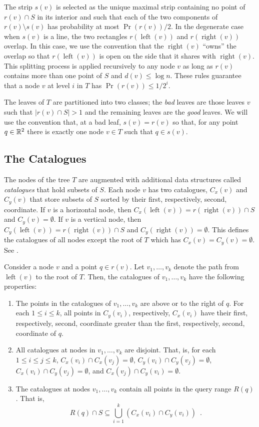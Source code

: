 \documentclass[lotsofwhite,charterfonts]{patmorin}
\DeclareMathOperator{\lft}{left}
\DeclareMathOperator{\rght}{right}
\newcommand{\depth}{d}
\begin{document}
The strip $s(v)$ is selected as the unique maximal strip containing no
point of $r(v)\cap S$ in its interior and such that each of the two
components of $r(v)\setminus s(v)$ has probability at most
$\Pr(r(v))/2$.  In the degenerate case when $s(v)$ is a line, the two
rectangles $r(\lft(v))$ and $r(\rght(v))$ overlap.  In this case, we
use the convention that the $\rght(v)$ ``owns'' the overlap so that
$r(\lft(v))$ is open on the side that it shares with $\rght(v)$.  This
splitting process is applied recursively to any node $v$ as long as
$r(v)$ contains more than one point of $S$ and $\depth(v)\le \log n$.
These rules guarantee that a node $v$ at level $i$ in $T$ has
$\Pr(r(v))\le 1/2^i$.

The leaves of $T$ are partitioned into two classes; the \emph{bad}
leaves are those leaves $v$ such that $|r(v)\cap S| > 1$ and the
remaining leaves are the \emph{good} leaves.  We will use the
convention that, at a bad leaf, $s(v)=r(v)$ so that, for any point
$q\in\mathbb{R}^2$ there is exactly one node $v\in T$ such that $q\in s(v)$.

\subsection{The Catalogues}

The nodes of the tree $T$ are augmented with additional data
structures called \emph{catalogues} that hold subsets of $S$.  Each
node $v$ has two catalogues, $C_x(v)$ and $C_y(v)$ that store subsets
of $S$ sorted by their first, respectively, second, coordinate. 
If $v$ is a horizontal node, then $C_x(\lft(v))=
r(\rght(v))\cap S$ and $C_y(v)=\emptyset$.  If $v$ is a
vertical node, then $C_y(\lft(v)) = r(\rght(v))\cap S$ and
$C_y(\rght(v))=\emptyset$.  This defines the catalogues of all nodes
except the root of $T$ which has $C_x(v)=C_y(v)=\emptyset$. See
.

Consider a node $v$ and a point $q\in r(v)$.  Let $v_1,\ldots,v_k$
denote the path from $\lft(v)$ to the root of $T$.  Then, the
catalogues of $v_1,\ldots,v_k$ have the following properties:
\begin{enumerate}
\item The points in the catalogues of $v_1,\ldots,v_k$ are above
or to the right of $q$.  For each $1\le i \le k$, all points in $C_y(v_i)$, respectively,
$C_x(v_i)$ have their first, respectively, second, coordinate greater
than the first, respectively, second, coordinate of $q$.

\item All catalogues at nodes in $v_1,\ldots,v_k$ are disjoint.  That,
is, for each $1\le i\le j \le k$,
$C_x(v_i)\cap C_x(v_j) = \emptyset$,
$C_y(v_i)\cap C_y(v_j) = \emptyset$,
$C_x(v_i)\cap C_y(v_j) = \emptyset$, and
$C_x(v_j)\cap C_y(v_i) = \emptyset$.

\item The catalogues at nodes $v_1,\ldots,v_k$ contain all points in
the query range $R(q)$.  That is,
\[
     R(q)\cap S \subseteq \bigcup_{i=1}^k \left(C_x(v_i)\cap C_y(v_i)\right)
        \enspace . 
\]
\end{enumerate}
\end{document}
